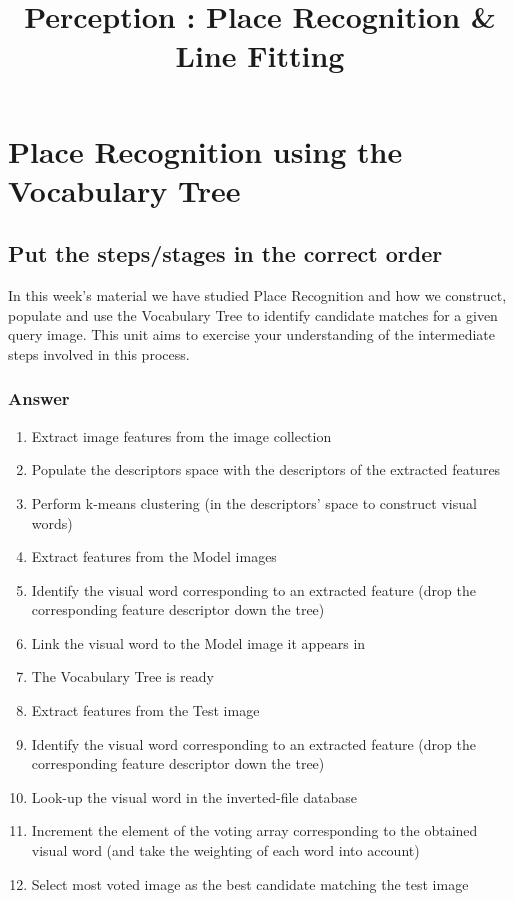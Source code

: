 \documentclass[12pt]{article}
\begin{document}
 
 
\title{Perception : Place Recognition \& Line Fitting}
\date{\vspace{-20mm}}
\maketitle

\section*{Place Recognition using the Vocabulary Tree} 

\subsection*{Put the steps/stages in the correct order}

In this week’s material we have studied Place Recognition and how we construct, populate and use the Vocabulary Tree to identify candidate matches for a given query image. This unit aims to exercise your understanding of the intermediate steps involved in this process.

\subsubsection*{Answer}

\begin{enumerate}
	\item Extract image features from the image collection
	\item Populate the descriptors space with the descriptors of the extracted features
	\item Perform k-means clustering (in the descriptors’ space to construct visual words)
	\item Extract features from the Model images
	\item Identify the visual word corresponding to an extracted feature (drop the corresponding feature descriptor down the tree)
	\item Link the visual word to the Model image it appears in
	\item The Vocabulary Tree is ready
	\item Extract features from the Test image
	\item Identify the visual word corresponding to an extracted feature (drop the corresponding feature descriptor down the tree)
	\item Look-up the visual word in the inverted-file database
	\item Increment the element of the voting array corresponding to the obtained visual word (and take the weighting of each word into account)
	\item Select most voted image as the best candidate matching the test image
\end{enumerate}
\end{document}
